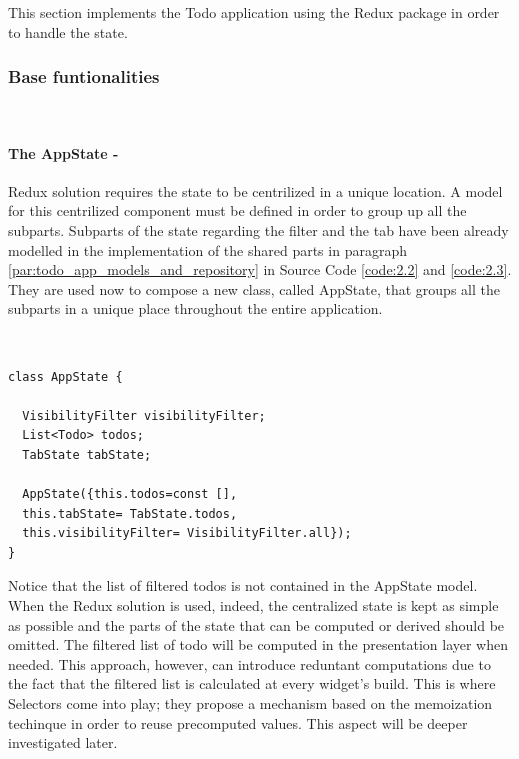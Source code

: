 This section implements the Todo application using the Redux package in order to handle the state. 
\subsubsection{Base funtionalities} \label{par:todo_app_inherited_widget_introduction}
\hfill\\
\paragraph{The AppState - }
\label{subpar:todo_app_bloc_core_state}
Redux solution requires the state to be centrilized in a unique location. A model for this centrilized component must be defined in order to group up all the subparts. Subparts of the state regarding the filter and the tab have been already modelled in the implementation of the shared parts in paragraph  \ref{par:todo_app_models_and_repository} in Source Code \ref{code:2.2} and \ref{code:2.3}. They are used now to compose a new class, called AppState, that groups all the subparts in a unique place throughout the entire application. 
\begin{code}
\mbox{}\\
 \mbox{}
		\label{code:2.14}
\begin{verbatim}
class AppState {

  VisibilityFilter visibilityFilter;
  List<Todo> todos;
  TabState tabState;

  AppState({this.todos=const [],
  this.tabState= TabState.todos,
  this.visibilityFilter= VisibilityFilter.all});
}
\end{verbatim}
\mbox{}
\end{code}

Notice that the list of filtered todos is not contained in the AppState model. When the Redux solution is used, indeed, the centralized state is kept as simple as possible and the parts of the state that can be computed or derived should be omitted. The filtered list of todo will be computed in the presentation layer when needed. This approach, however, can introduce reduntant computations due to the fact that the filtered list is calculated at every widget's build. This is where Selectors come into play; they propose a mechanism based on the memoization techinque in order to reuse precomputed values. This aspect will be deeper investigated later.
